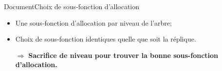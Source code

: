 \begin{frame}{Document}{Choix de sous-fonction d'allocation}

  \hspace{-1cm}
  \begin{minipage}{0.45\textwidth}
    \begin{center}
      
    \end{center}
  \end{minipage}
  \hfill
  \begin{minipage}{0.45\textwidth}
    \begin{center}
      
    \end{center}
  \end{minipage}

  \vspace{0.5cm}
  
  \begin{itemize}
  \item Une sous-fonction d'allocation par niveau de l'arbre;
  \item Choix de sous-fonction identiques quelle que soit la réplique.
  \end{itemize}

  \vspace{0.5cm}

  \large
  \begin{itemize}
  \item [$\Rightarrow$] \textbf{Sacrifice de niveau pour trouver la bonne sous-fonction
    d'allocation.}
  \end{itemize}

\end{frame}

